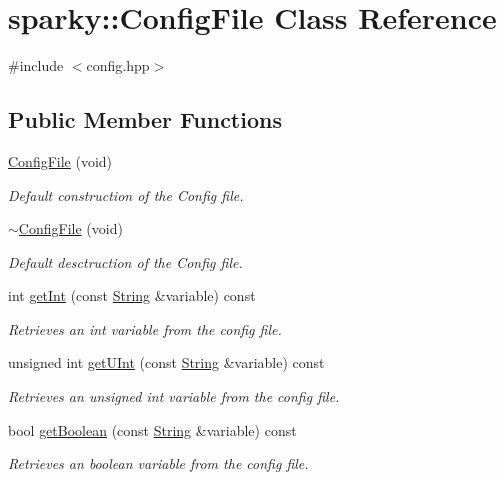 \hypertarget{classsparky_1_1_config_file}{}\section{sparky\+:\+:Config\+File Class Reference}
\label{classsparky_1_1_config_file}


{\ttfamily \#include $<$config.\+hpp$>$}

\subsection*{Public Member Functions}
\begin{DoxyCompactItemize}
\item 
\hyperlink{classsparky_1_1_config_file_a559c62c667e2c5544ac66c40da56f11e}{Config\+File} (void)
\begin{DoxyCompactList}\small\item\em Default construction of the Config file. \end{DoxyCompactList}\item 
\hyperlink{classsparky_1_1_config_file_a1fb2ad71ff82a4395e991e7ea5d699fd}{$\sim$\+Config\+File} (void)
\begin{DoxyCompactList}\small\item\em Default desctruction of the Config file. \end{DoxyCompactList}\item 
int \hyperlink{classsparky_1_1_config_file_aff50a568d37cedf16a6de8d99caa8073}{get\+Int} (const \hyperlink{classsparky_1_1_string}{String} \&variable) const 
\begin{DoxyCompactList}\small\item\em Retrieves an int variable from the config file. \end{DoxyCompactList}\item 
unsigned int \hyperlink{classsparky_1_1_config_file_a9422d86533a7f8d1c1e57c5414c2c854}{get\+U\+Int} (const \hyperlink{classsparky_1_1_string}{String} \&variable) const 
\begin{DoxyCompactList}\small\item\em Retrieves an unsigned int variable from the config file. \end{DoxyCompactList}\item 
bool \hyperlink{classsparky_1_1_config_file_a41849efd418733b5ec0ea891987a82de}{get\+Boolean} (const \hyperlink{classsparky_1_1_string}{String} \&variable) const 
\begin{DoxyCompactList}\small\item\em Retrieves an boolean variable from the config file. \end{DoxyCompactList}\item 

\end{DoxyCompactItemize}
